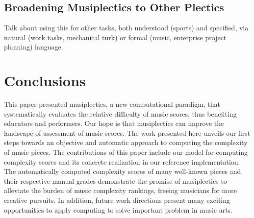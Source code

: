 \documentclass[12pt]{report}
\begin{document}
\section{Broadening Musiplectics to Other Plectics}
\label{sec:broad}

Talk about using this for other tasks, both understood (sports) and specified, via natural (work tasks, mechanical turk) or formal (music, enterprise project planning) language.

\chapter{Conclusions} 
\label{sec:conclu}

This paper presented musiplectics, a new computational paradigm, that systematically evaluates the relative difficulty of music scores, thus benefiting educators and performers. Our hope is that musiplectics can improve the landscape of assessment of music scores. The work presented here unveils our first steps towards an objective and automatic approach to computing the complexity of music pieces. The contributions of this paper include our model for computing complexity scores and its concrete realization in our reference implementation. The automatically computed complexity scores of many well-known pieces and their respective manual grades demonstrate the promise of musiplectics to alleviate the burden of music complexity rankings, freeing musicians for more creative pursuits. In addition, future work directions present many exciting opportunities to apply computing to solve important problem in music arts.

%
%

%

\end{document}

